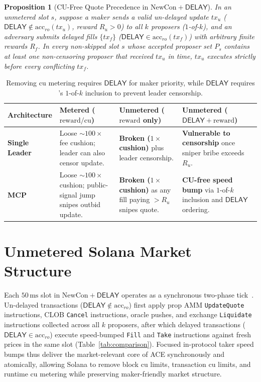 \documentclass[10pt,a4paper]{article}
\newtheorem{proposition}{Proposition}
\newcommand{\DelaySym}{\mathsf{DELAY}}
\newcommand{\NewCon}{\text{NewCon}}
\begin{document}
\begin{proposition}[CU-Free Quote Precedence in $\NewCon + \DelaySym$]
\label{prop:synergy}
In an unmetered \NewCon{} slot $s$, suppose a maker sends a valid un-delayed update $\mathit{tx}_u$ ($\DelaySym \notin \mathrm{acc}_{ro}(\mathit{tx}_u)$, reward $R_u > 0$) to all $k$ proposers ($1$-of-$k$), and an adversary submits delayed fills $\{\mathit{tx}_f\}$ ($\DelaySym \in \mathrm{acc}_{ro}(\mathit{tx}_f)$) with arbitrary finite rewards $R_f$. In every non-skipped slot $s$ whose accepted proposer set $P_s$ contains at least one non-censoring proposer that received $\mathit{tx}_u$ in time, $\mathit{tx}_u$ executes strictly before every conflicting $\mathit{tx}_f$.
\end{proposition}

\begin{table}[h!]
\centering
\footnotesize
\renewcommand{\arraystretch}{1.16}
\begin{tabularx}{\textwidth}{@{}l Y Y Y@{}}
\toprule
\textbf{Architecture} & \textbf{Metered ($\mathrm{reward}/\mathrm{cu}$)} & \textbf{Unmetered ($\mathrm{reward}$ only)} & \textbf{Unmetered ($\DelaySym + \mathrm{reward}$)} \\
\midrule
\textbf{Single Leader}
  & Loose $\sim\!100\times$ fee cushion; leader can also censor update.
  & \textbf{Broken ($1\times$ cushion)} plus leader censorship.
  & \textbf{Vulnerable to censorship} once sniper bribe exceeds $R_u$. \\
\addlinespace[0.2em]
\textbf{\NewCon{} MCP}
  & Loose $\sim\!100\times$ cushion; public-signal jump snipes outbid update.
  & \textbf{Broken ($1\times$ cushion)} as any fill paying $> R_u$ snipes quote.
  & \textbf{CU-free speed bump} via $1$-of-$k$ inclusion and $\DelaySym$ ordering. \\
\bottomrule
\end{tabularx}
\caption{Removing $\mathrm{cu}$ metering requires $\DelaySym$ for maker priority, while $\DelaySym$ requires \NewCon's $1$-of-$k$ inclusion to prevent leader censorship.}
\label{tab:duality}
\end{table}

\section{Unmetered Solana Market Structure}

Each $50\,\text{ms}$ slot in $\NewCon + \DelaySym$ operates as a synchronous two-phase tick~\cite{BCS15,CF23}. Un-delayed transactions ($\DelaySym \notin \mathrm{acc}_{ro}$) first apply prop AMM \texttt{UpdateQuote} instructions, CLOB \texttt{Cancel} instructions, oracle pushes, and exchange \texttt{Liquidate} instructions collected across all $k$ proposers, after which delayed transactions ($\DelaySym \in \mathrm{acc}_{ro}$) execute speed-bumped \texttt{Fill} and \texttt{Take} instructions against fresh prices in the same slot (Table~\ref{tab:comparison}). Focused in-protocol taker speed bumps thus deliver the market-relevant core of ACE synchronously and atomically, allowing Solana to remove block $\mathrm{cu}$ limits, transaction $\mathrm{cu}$ limits, and runtime $\mathrm{cu}$ metering while preserving maker-friendly market structure.
\end{document}

